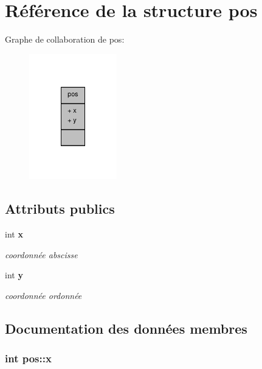 \section{Référence de la structure pos}
\label{structpos}


Graphe de collaboration de pos\-:\nopagebreak
\begin{figure}[H]
\begin{center}
\leavevmode
\includegraphics[width=108pt]{structpos__coll__graph}
\end{center}
\end{figure}
\subsection*{Attributs publics}
\begin{DoxyCompactItemize}
\item 
int {\bf x}
\begin{DoxyCompactList}\small\item\em coordonnée abscisse \end{DoxyCompactList}\item 
int {\bf y}
\begin{DoxyCompactList}\small\item\em coordonnée ordonnée \end{DoxyCompactList}\end{DoxyCompactItemize}


\subsection{Documentation des données membres}
\subsubsection[{x}]{\setlength{\rightskip}{0pt plus 5cm}int pos\-::x}\label{structpos_aac09c213542d5ffc796972c3c10e4d1c}


